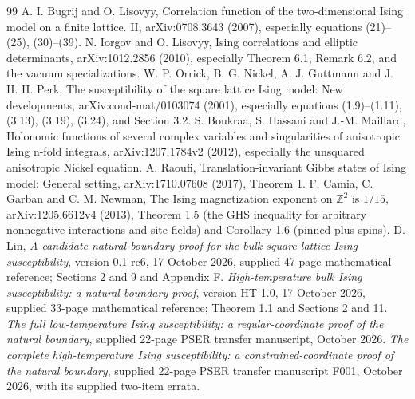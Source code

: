 \documentclass[11pt]{article}
\numberwithin{equation}{section}
\theoremstyle{definition}
\begin{document}
\begin{thebibliography}{99}
 A. I. Bugrij and O. Lisovyy, Correlation function of the two-dimensional
Ising model on a finite lattice. II, arXiv:0708.3643 (2007), especially
equations (21)--(25), (30)--(39).
 N. Iorgov and O. Lisovyy, Ising correlations and elliptic determinants,
arXiv:1012.2856 (2010), especially Theorem 6.1, Remark 6.2,
and the vacuum specializations.
 W. P. Orrick, B. G. Nickel, A. J. Guttmann and J. H. H. Perk,
The susceptibility of the square lattice Ising model: New developments,
arXiv:cond-mat/0103074 (2001), especially equations (1.9)--(1.11),
(3.13), (3.19), (3.24), and Section 3.2.
 S. Boukraa, S. Hassani and J.-M. Maillard,
Holonomic functions of several complex variables and singularities of
anisotropic Ising n-fold integrals, arXiv:1207.1784v2 (2012),
especially the unsquared anisotropic Nickel equation.
 A. Raoufi, Translation-invariant Gibbs states of Ising model:
General setting, arXiv:1710.07608 (2017), Theorem 1.
 F. Camia, C. Garban and C. M. Newman, The Ising magnetization
exponent on $\mathbb Z^2$ is $1/15$, arXiv:1205.6612v4 (2013),
Theorem 1.5 (the GHS inequality for arbitrary nonnegative interactions
and site fields) and Corollary 1.6 (pinned plus spins).
 D. Lin, \emph{A candidate natural-boundary proof for the bulk
square-lattice Ising susceptibility}, version 0.1-rc6, 17 October 2026,
supplied 47-page mathematical reference; Sections 2 and 9 and Appendix F.
 \emph{High-temperature bulk Ising susceptibility:
a natural-boundary proof}, version HT-1.0, 17 October 2026,
supplied 33-page mathematical reference; Theorem 1.1 and Sections 2 and 11.
 \emph{The full low-temperature Ising susceptibility:
a regular-coordinate proof of the natural boundary},
supplied 22-page PSER transfer manuscript, October 2026.
 \emph{The complete high-temperature Ising susceptibility:
a constrained-coordinate proof of the natural boundary},
supplied 22-page PSER transfer manuscript F001, October 2026,
with its supplied two-item errata.
\end{thebibliography}
\end{document}
